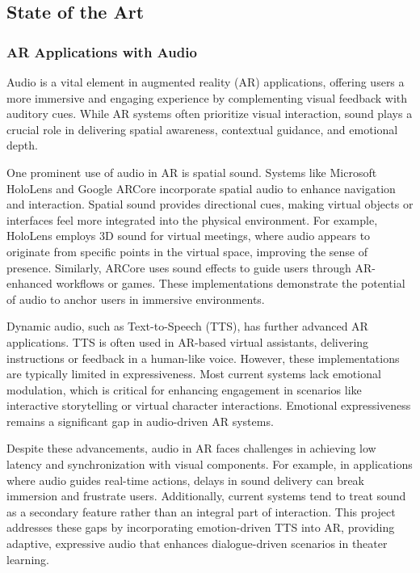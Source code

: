 \subsection{State of the Art}
\subsubsection{AR Applications with Audio}
Audio is a vital element in augmented reality (AR) applications, offering users a more immersive and engaging experience by complementing visual feedback with auditory cues. While AR systems often prioritize visual interaction, sound plays a crucial role in delivering spatial awareness, contextual guidance, and emotional depth.

One prominent use of audio in AR is spatial sound. Systems like Microsoft HoloLens and Google ARCore incorporate spatial audio to enhance navigation and interaction. Spatial sound provides directional cues, making virtual objects or interfaces feel more integrated into the physical environment. For example, HoloLens employs 3D sound for virtual meetings, where audio appears to originate from specific points in the virtual space, improving the sense of presence. Similarly, ARCore uses sound effects to guide users through AR-enhanced workflows or games. These implementations demonstrate the potential of audio to anchor users in immersive environments.

Dynamic audio, such as Text-to-Speech (TTS), has further advanced AR applications. TTS is often used in AR-based virtual assistants, delivering instructions or feedback in a human-like voice. However, these implementations are typically limited in expressiveness. Most current systems lack emotional modulation, which is critical for enhancing engagement in scenarios like interactive storytelling or virtual character interactions. Emotional expressiveness remains a significant gap in audio-driven AR systems.

Despite these advancements, audio in AR faces challenges in achieving low latency and synchronization with visual components. For example, in applications where audio guides real-time actions, delays in sound delivery can break immersion and frustrate users. Additionally, current systems tend to treat sound as a secondary feature rather than an integral part of interaction. This project addresses these gaps by incorporating emotion-driven TTS into AR, providing adaptive, expressive audio that enhances dialogue-driven scenarios in theater learning.

